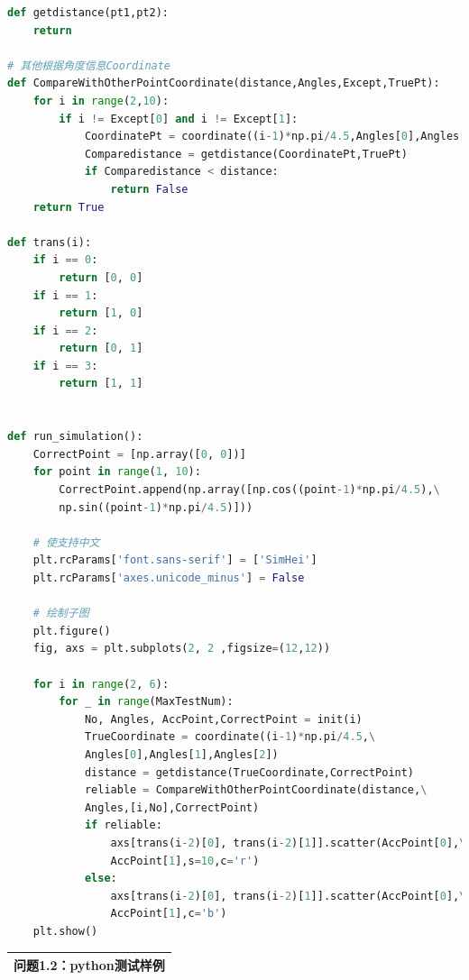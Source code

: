 \documentclass{my_paper}
\begin{document}
\begin{lstlisting}[language=Python]
def getdistance(pt1,pt2):
    return 

# 其他根据角度信息Coordinate
def CompareWithOtherPointCoordinate(distance,Angles,Except,TruePt):
    for i in range(2,10):
        if i != Except[0] and i != Except[1]:
            CoordinatePt = coordinate((i-1)*np.pi/4.5,Angles[0],Angles[1],Angles[2])
            Comparedistance = getdistance(CoordinatePt,TruePt)
            if Comparedistance < distance:
                return False
    return True

def trans(i):
    if i == 0:
        return [0, 0]
    if i == 1:
        return [1, 0]
    if i == 2:
        return [0, 1]
    if i == 3:
        return [1, 1]


def run_simulation():
    CorrectPoint = [np.array([0, 0])]
    for point in range(1, 10):
        CorrectPoint.append(np.array([np.cos((point-1)*np.pi/4.5),\
        np.sin((point-1)*np.pi/4.5)]))

    # 使支持中文
    plt.rcParams['font.sans-serif'] = ['SimHei']
    plt.rcParams['axes.unicode_minus'] = False
    
    # 绘制子图
    plt.figure()
    fig, axs = plt.subplots(2, 2 ,figsize=(12,12))

    for i in range(2, 6):
        for _ in range(MaxTestNum):
            No, Angles, AccPoint,CorrectPoint = init(i)
            TrueCoordinate = coordinate((i-1)*np.pi/4.5,\
            Angles[0],Angles[1],Angles[2])
            distance = getdistance(TrueCoordinate,CorrectPoint)
            reliable = CompareWithOtherPointCoordinate(distance,\
            Angles,[i,No],CorrectPoint)
            if reliable:
                axs[trans(i-2)[0], trans(i-2)[1]].scatter(AccPoint[0],\
                AccPoint[1],s=10,c='r')
            else:
                axs[trans(i-2)[0], trans(i-2)[1]].scatter(AccPoint[0],\
                AccPoint[1],c='b')
    plt.show()
\end{lstlisting}




\begin{table}[htbp]
    \centering
    \begin{tabular}{|p{14.0cm}|}
    \hline
    \textbf{问题1.2：python测试样例} \\ %
    \hline
    \end{tabular}
\end{table}
\end{document}
